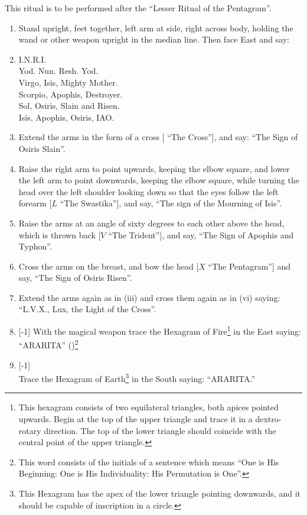 This ritual is to be performed after the \enquote{Lesser Ritual of the Pentagram}.
\begin{enumerate}[label=(\textit{\Roman*})]
\item Stand upright, feet together, left arm at side, right across body, holding the wand or other weapon upright in the median line. Then face East and say:
\item I.N.R.I. \\
Yod. Nun. Resh. Yod. \\
Virgo, Isis, Mighty Mother. \\
Scorpio, Apophis, Destroyer. \\
Sol, Osiris, Slain and Risen. \\
Isis, Apophis, Osiris, IAO.
\item Extend the arms in the form of a cross [\Cross \textendash{} \enquote{The Cross}], and say: \enquote{The Sign of Osiris Slain}.
\item Raise the right arm to point upwards, keeping the elbow square, and lower the left arm to point downwards, keeping the elbow square, while turning the head over the left shoulder looking down so that the eyes follow the left forearm [$L$ \textendash{} \enquote{The Swastika}], and say, \enquote{The sign of the Mourning of Isis}.
\item Raise the arms at an angle of sixty degrees to each other above the head, which is thrown back [$V$ \textendash{} \enquote{The Trident}], and say, \enquote{The Sign of Apophis and Typhon}.
\item Cross the arms on the breast, and bow the head [$X$ \textendash{} \enquote{The Pentagram}] and say, \enquote{The Sign of Osiris Risen}.
\item Extend the arms again as in (iii) and cross them again as in (vi) saying: \enquote{L.V.X., Lux, the Light of the Cross}.
\item {}[-1] With the magical weapon trace the Hexagram of Fire\footnote{This hexagram consists of two equilateral triangles, both apices pointed upwards. Begin at the top of the upper triangle and trace it in a dextro-rotary direction. The top of the lower triangle should coincide with the central point of the upper triangle.} in the East saying: \enquote{ARARITA} ()\footnote{This word consists of the initials of a sentence which means \enquote{One is His Beginning: One is His Individuality: His Permutation is One}.}
\item {}[-1] \\ Trace the Hexagram of Earth\footnote{This Hexagram has the apex of the lower triangle pointing downwards, and it should be capable of inscription in a circle.} in the South saying: \enquote{ARARITA.}

\end{enumerate}

